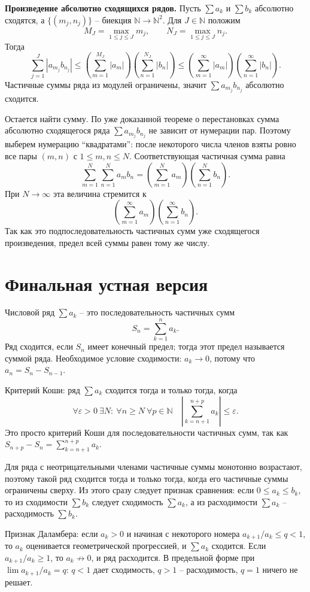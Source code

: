 \documentclass[12pt,a4paper]{article}
\newcommand{\N}{\mathbb{N}}
\newcommand{\eps}{\varepsilon}
\begin{document}
\textbf{Произведение абсолютно сходящихся рядов.}
Пусть \(\sum a_k\) и \(\sum b_k\) абсолютно сходятся, а
\(\{(m_j,n_j)\}\) -- биекция \(\N\to\N^2\). Для \(J\in\N\) положим
\[
  M_J=\max_{1\le j\le J}m_j,\qquad
  N_J=\max_{1\le j\le J}n_j.
\]
Тогда
\[
  \sum_{j=1}^{J}|a_{m_j}b_{n_j}|
  \le
  \left(\sum_{m=1}^{M_J}|a_m|\right)
  \left(\sum_{n=1}^{N_J}|b_n|\right)
  \le
  \left(\sum_{m=1}^{\infty}|a_m|\right)
  \left(\sum_{n=1}^{\infty}|b_n|\right).
\]
Частичные суммы ряда из модулей ограничены, значит
\(\sum a_{m_j}b_{n_j}\) абсолютно сходится.

Остается найти сумму. По уже доказанной теореме о перестановках сумма
абсолютно сходящегося ряда \(\sum a_{m_j}b_{n_j}\) не зависит от нумерации
пар. Поэтому выберем нумерацию ``квадратами'': после некоторого числа членов
взяты ровно все пары \((m,n)\) с \(1\le m,n\le N\). Соответствующая частичная
сумма равна
\[
  \sum_{m=1}^{N}\sum_{n=1}^{N}a_m b_n
  =
  \left(\sum_{m=1}^{N}a_m\right)
  \left(\sum_{n=1}^{N}b_n\right).
\]
При \(N\to\infty\) эта величина стремится к
\[
  \left(\sum_{m=1}^{\infty}a_m\right)
  \left(\sum_{n=1}^{\infty}b_n\right).
\]
Так как это подпоследовательность частичных сумм уже сходящегося произведения,
предел всей суммы равен тому же числу.

\section*{Финальная устная версия}

Числовой ряд \(\sum a_k\) -- это последовательность частичных сумм
\[
  S_n=\sum_{k=1}^{n}a_k.
\]
Ряд сходится, если \(S_n\) имеет конечный предел; тогда этот предел называется
суммой ряда. Необходимое условие сходимости: \(a_k\to0\), потому что
\(a_n=S_n-S_{n-1}\).

Критерий Коши: ряд \(\sum a_k\) сходится тогда и только тогда, когда
\[
  \forall\eps>0\ \exists N:\ \forall n\ge N\ \forall p\in\N
  \quad
  \left|\sum_{k=n+1}^{n+p}a_k\right|\le\eps.
\]
Это просто критерий Коши для последовательности частичных сумм, так как
\(S_{n+p}-S_n=\sum_{k=n+1}^{n+p}a_k\).

Для ряда с неотрицательными членами частичные суммы монотонно возрастают,
поэтому такой ряд сходится тогда и только тогда, когда его частичные суммы
ограничены сверху. Из этого сразу следует признак сравнения:
если \(0\le a_k\le b_k\), то из сходимости \(\sum b_k\) следует сходимость
\(\sum a_k\), а из расходимости \(\sum a_k\) -- расходимость \(\sum b_k\).

Признак Даламбера: если \(a_k>0\) и начиная с некоторого номера
\(a_{k+1}/a_k\le q<1\), то \(a_k\) оценивается геометрической прогрессией, и
\(\sum a_k\) сходится. Если \(a_{k+1}/a_k\ge1\), то \(a_k\not\to0\), и ряд
расходится. В предельной форме при \(\lim a_{k+1}/a_k=q\): \(q<1\) дает
сходимость, \(q>1\) -- расходимость, \(q=1\) ничего не решает.
\end{document}
